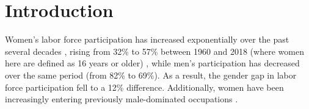 \documentclass[a4paper, nobind]{templates/ociamthesis}
\begin{document}
\begin{romanpages}
\begin{abstract}
\end{abstract}


  \dominitoc %

\flushbottom

\tableofcontents

\listoffigures
	\mtcaddchapter


\end{romanpages}

\flushbottom

\hypertarget{introduction}{%
\chapter*{Introduction}\label{introduction}}

\adjustmtc
{}

Women's labor force participation has increased exponentially over the past several decades \autocite{Goldin2006a,Statistics2020}, rising from 32\% to 57\% between 1960 and 2018 (where women here are defined as 16 years or older) \autocite{Statistics2020,Blau2017,Eagly2019}, while men's participation has decreased over the same period (from 82\% to 69\%). As a result, the gender gap in labor force participation fell to a 12\% difference. Additionally, women have been increasingly entering previously male-dominated occupations \autocite{Blau2013,Reskin2009,England2010}.
\end{document}
